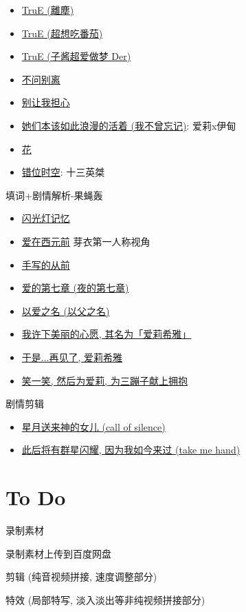 \documentclass[a4paper]{article}
\begin{document}
\begin{itemize}
    \item \href{https://www.bilibili.com/video/BV1gB4y1V7XK/}{TruE (離塵)}
    \item \href{https://www.bilibili.com/video/BV1SF411w73C/}{TruE (超想吃番茄)}
    \item \href{https://www.bilibili.com/video/BV1MB4y1V71h/}{TruE (子酱超爱做梦 Der)}
    \item \href{https://www.bilibili.com/video/BV19a4y1S7wF/}{不问别离}
    \item \href{https://www.bilibili.com/video/BV1vC4y177zp/}{别让我担心}
    \item \href{https://www.bilibili.com/video/BV1pu411a7cv/}{她们本该如此浪漫的活着 (我不曾忘记)}: 爱莉x伊甸
    \item \href{https://www.bilibili.com/video/BV1DT41167gi/}{花}
    \item \href{https://www.bilibili.com/video/BV1Le4y1R73E/}{错位时空}: 十三英桀
\end{itemize}

填词+剧情解析-果蝇轰

\begin{itemize}
    \item \href{https://www.bilibili.com/video/BV1HppJeuEis/}{闪光灯记忆}
    \item \href{https://www.bilibili.com/video/BV1 qN411g71m/}{爱在西元前} 芽衣第一人称视角
    \item \href{https://www.bilibili.com/video/BV1PV4y1x7CD/}{手写的从前}
    \item \href{https://www.bilibili.com/video/BV1dr4y177gy/}{爱的第七章 (夜的第七章)}
    \item \href{https://www.bilibili.com/video/BV1Yr4y1q7Pt/}{以爱之名 (以父之名)}
    \item \href{https://www.bilibili.com/video/BV1BF411w7fD/}{我许下美丽的心愿, 其名为「爱莉希雅」}
    \item \href{https://www.bilibili.com/video/BV1Cr4y1573W/}{于是...再见了, 爱莉希雅}
    \item \href{https://www.bilibili.com/video/BV1WN4y1L745/}{笑一笑, 然后为爱莉, 为三蹦子献上拥抱}
\end{itemize}

剧情剪辑

\begin{itemize}
    \item \href{https://www.bilibili.com/video/BV1ZT4y1s7Zd/}{星月送来神的女儿 (call of silence)}
    \item \href{https://www.bilibili.com/video/BV1Sm41167aK/}{此后将有群星闪耀, 因为我如今来过 (take me hand)}
\end{itemize}

\section{To Do}

录制素材

录制素材上传到百度网盘

剪辑 (纯音视频拼接, 速度调整部分)

特效 (局部特写, 淡入淡出等非纯视频拼接部分)
\end{document}
